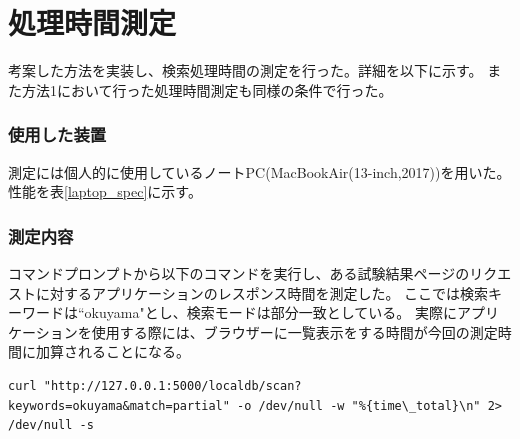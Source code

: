 
\clearpage
\section{処理時間測定} \label{sec:search_process_time_mes}

考案した方法を実装し、検索処理時間の測定を行った。詳細を以下に示す。
また方法1において行った処理時間測定も同様の条件で行った。

\subsubsection{使用した装置}

測定には個人的に使用しているノートPC(MacBookAir(13-inch,2017))を用いた。
性能を表\ref{laptop_spec}に示す。

\begin{table}[tbp]
\caption[測定に使用したノートPCの性能]{測定に使用したノートPC(MacBookAir(13-inch,2017))の性能。検索処理時間の測定に個人的に使用しているノートPCを使用した。}
\label{laptop_spec}
\end{table}

\subsubsection{測定内容}

コマンドプロンプトから以下のコマンドを実行し、ある試験結果ページのリクエストに対するアプリケーションのレスポンス時間を測定した。
ここでは検索キーワードは``okuyama"とし、検索モードは部分一致としている。
実際にアプリケーションを使用する際には、ブラウザーに一覧表示をする時間が今回の測定時間に加算されることになる。

{ \small
\begin{lstlisting}
curl "http://127.0.0.1:5000/localdb/scan?keywords=okuyama&match=partial" -o /dev/null -w "%{time\_total}\n" 2> /dev/null -s
\end{lstlisting}
}

